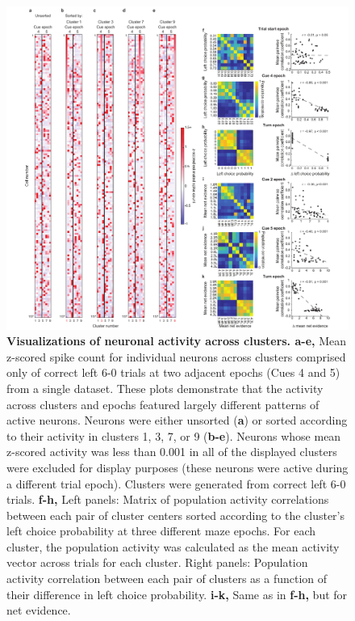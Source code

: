 \begin{figure}
\includegraphics[width=1\textwidth,center]{figures/fig_3_8.pdf}
\caption[Visualizations of neuronal activity across clusters.]
{\textbf{Visualizations of neuronal activity across clusters. a-e,} Mean z-scored spike count for individual neurons across clusters comprised only of correct left 6-0 trials at two adjacent epochs (Cues 4 and 5) from a single dataset. These plots demonstrate that the activity across clusters and epochs featured largely different patterns of active neurons. Neurons were either unsorted (\textbf{a}) or sorted according to their activity in clusters 1, 3, 7, or 9 (\textbf{b-e}). Neurons whose mean z-scored activity was less than 0.001 in all of the displayed clusters were excluded for display purposes (these neurons were active during a different trial epoch). Clusters were generated from correct left 6-0 trials.
%
\textbf{f-h,} Left panels: Matrix of population activity correlations between each pair of cluster centers sorted according to the cluster's left choice probability at three different maze epochs. For each cluster, the population activity was calculated as the mean activity vector across trials for each cluster. Right panels: Population activity correlation between each pair of clusters as a function of their difference in left choice probability.  
%
\textbf{i-k,} Same as in \textbf{f-h,} but for net evidence. 
\label{fig:3_8}}
\end{figure}

